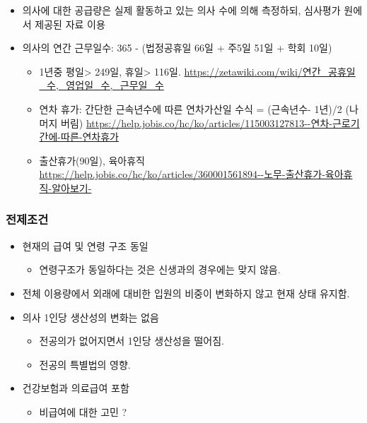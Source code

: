 \documentclass[]{book}
\providecommand{\tightlist}{%
  \setlength{\itemsep}{0pt}\setlength{\parskip}{0pt}}
\begin{document}
\begin{itemize}
\item
  의사에 대한 공급량은 실제 활동하고 있는 의사 수에 의해 측정하되, 심사평가 원에서 제공된 자료 이용
\item
  의사의 연간 근무일수: 365 - (법정공휴일 66일 + 주5일 51일 + 학회 10일)

  \begin{itemize}
  \tightlist
  \item
    1년중 평일\textgreater{} 249일, 휴일\textgreater{} 116일. \url{https://zetawiki.com/wiki/연간_공휴일_수,_영업일_수,_근무일_수}
  \item
    연차 휴가: 간단한 근속년수에 따른 연차가산일 수식 = (근속년수- 1년)/2 (나머지 버림) \url{https://help.jobis.co/hc/ko/articles/115003127813--연차-근로기간에-따른-연차휴가}
  \item
    출산휴가(90일), 육아휴직 \url{https://help.jobis.co/hc/ko/articles/360001561894--노무-출산휴가-육아휴직-알아보기-}
  \end{itemize}
\end{itemize}

\hypertarget{section-7}{%
\subsubsection{전제조건}\label{section-7}}

\begin{itemize}
\item
  현재의 급여 및 연령 구조 동일

  \begin{itemize}
  \tightlist
  \item
    연령구조가 동일하다는 것은 신생과의 경우에는 맞지 않음.
  \end{itemize}
\item
  전체 이용량에서 외래에 대비한 입원의 비중이 변화하지 않고 현재 상태 유지함.
\item
  의사 1인당 생산성의 변화는 없음

  \begin{itemize}
  \tightlist
  \item
    전공의가 없어지면서 1인당 생산성을 떨어짐.
  \item
    전공의 특별법의 영향.
  \end{itemize}
\item
  건강보험과 의료급여 포함

  \begin{itemize}
  \tightlist
  \item
    비급여에 대한 고민 ?
  \end{itemize}
\end{itemize}
\end{document}
